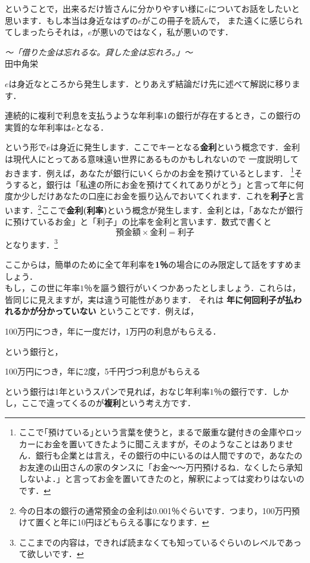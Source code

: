 ということで，出来るだけ皆さんに分かりやすい様に$e$についてお話をしたいと思います．もし本当は身近なはずの$e$がこの冊子を読んで，
また遠くに感じられてしまったらそれは，$e$が悪いのではなく，私が悪いのです．

\begin{flushright}
\textit {〜「借りた金は忘れるな。貸した金は忘れろ。」〜}\\
田中角栄
\end{flushright}

$e$は身近なところから発生します．とりあえず結論だけ先に述べて解説に移ります．
\begin{center}
連続的に複利で利息を支払うような年利率$1$の銀行が存在するとき，この銀行の実質的な年利率は$e$となる．
\end{center}
という形で$e$は身近に発生します．ここでキーとなる\textbf{金利}という概念です．金利は現代人にとってある意味遠い世界にあるものかもしれないので
一度説明しておきます．例えば，あなたが銀行にいくらかのお金を預けているとします．
\footnote{ここで｢預けている｣という言葉を使うと，まるで厳重な鍵付きの金庫やロッカーにお金を置いてきたように聞こえますが，そのようなことはありません．銀行も企業とは言え，その銀行の中にいるのは人間ですので，あなたのお友達の山田さんの家のタンスに「お金〜〜万円預けるね．なくしたら承知しないよ．」と言ってお金を置いてきたのと，解釈によっては変わりはないのです．}そうすると，銀行は「私達の所にお金を預けてくれてありがとう」と言って年に何度か少しだけあなたの口座にお金を振り込んでおいてくれます．これを\textbf{利子}と言います．\footnote{今の日本の銀行の通常預金の金利は0.001％ぐらいです．つまり，100万円預けて置くと年に10円ほどもらえる事になります．}ここで\textbf{金利(利率)}という概念が発生します．金利とは，「あなたが銀行に預けているお金」と「利子」の比率を金利と言います．数式で書くと
\[
\mbox{預金額}\times\mbox{金利} = \mbox{利子}
\]
となります．\footnote{ここまでの内容は，できれば読まなくても知っているぐらいのレベルであって欲しいです．}

ここからは，簡単のために全て年利率を\textbf{1％}の場合にのみ限定して話をすすめましょう．\\
もし，この世に年率$1$％を謳う銀行がいくつかあったとしましょう．これらは，皆同じに見えますが，実は違う可能性があります．
それは \textbf{年に何回利子が払われるかが分かっていない} ということです．例えば，
\begin{center}
100万円につき，年に一度だけ，1万円の利息がもらえる．
\end{center}
という銀行と，
\begin{center}
100万円につき，年に2度，5千円づつ利息がもらえる
\end{center}
という銀行は1年というスパンで見れば，おなじ年利率$1$％の銀行です．しかし，ここで違ってくるのが\textbf{複利}という考え方です．

